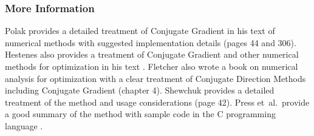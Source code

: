 \subsubsection{More Information}
Polak provides a detailed treatment of Conjugate Gradient in his text of numerical methods with suggested implementation details \cite{Polak1971} (pages 44 and 306).
Hestenes also provides a treatment of Conjugate Gradient and other numerical methods for optimization in his text \cite{Hestenes1980}.
Fletcher also wrote a book on numerical analysis for optimization with a clear treatment of Conjugate Direction Methods including Conjugate Gradient \cite{Fletcher2000} (chapter 4).
Shewchuk provides a detailed treatment of the method and usage considerations \cite{Shewchuk1994} (page 42).
Press et~al.\ provide a good summary of the method with sample code in the C programming language \cite{Press2007}.

